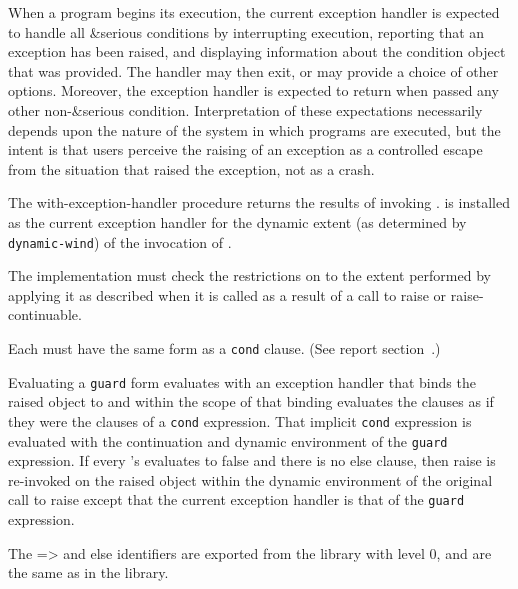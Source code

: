 When a program begins its execution, the current
exception handler is expected to handle all {\cf\&serious}
conditions by interrupting execution, reporting that an
exception has been raised, and displaying information
about the condition object that was provided.  The handler
may then exit, or may provide a choice of other options.
Moreover, the exception handler is expected to return when
passed any other non-{\cf\&serious} condition.
Interpretation of these expectations necessarily depends
upon the nature of the system in which programs are executed,
but the intent is that users perceive the raising of an
exception as a controlled escape from the situation that
raised the exception, not as a crash.

\begin{entry}{%
}

  The {\cf
with-exception-handler} procedure returns the results of invoking
.   is installed as the current
exception handler for the dynamic extent (as determined by {\tt
  dynamic-wind}) of the invocation of .

\implresp The implementation must check the restrictions on
 to the extent performed by applying it as described
when it is called as a result of a call to {\cf raise} or {\cf
  raise-continuable}.
\end{entry}

\begin{entry}{%
}

\syntax
Each  must have the same form as a {\tt cond} clause.
(See report section~.)

\semantics 
Evaluating a {\tt guard} form evaluates  with an exception
handler that binds the raised object to  and within the scope of
that binding evaluates the clauses as if they were the clauses of a
{\tt cond} expression. That implicit {\tt cond} expression is evaluated with the
continuation and dynamic environment of the {\tt guard} expression. If every
's  evaluates to false and there is no else clause, then
{\cf raise} is re-invoked on the raised object within the dynamic
environment of the original call to raise except that the current
exception handler is that of the {\tt guard} expression.  

The {\cf =>} and {\cf else} identifiers are exported from the
 library with level $0$, and are the same as
in the  library.
\end{entry}

